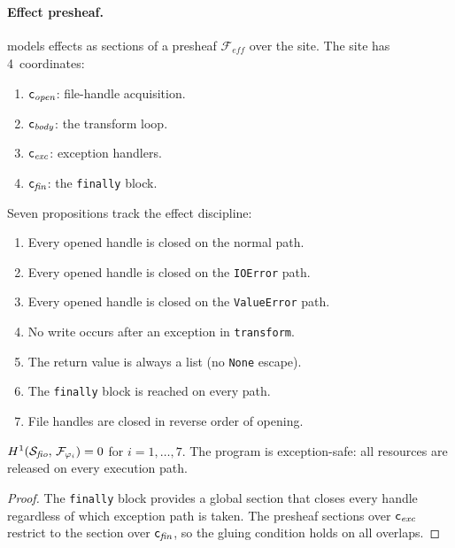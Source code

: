 \paragraph{Effect presheaf.}
\JuGeo{} models effects as sections of a presheaf
$\mathcal{F}_{\mathit{eff}}$ over the site.  The site has
4~coordinates:
\begin{enumerate}[nosep,label=(\roman*)]
  \item $\mathsf{c}_{\mathit{open}}$: file-handle acquisition.
  \item $\mathsf{c}_{\mathit{body}}$: the transform loop.
  \item $\mathsf{c}_{\mathit{exc}}$: exception handlers.
  \item $\mathsf{c}_{\mathit{fin}}$: the \texttt{finally} block.
\end{enumerate}

Seven propositions track the effect discipline:
\begin{enumerate}[nosep,label=(\roman*)]
  \item Every opened handle is closed on the normal path.
  \item Every opened handle is closed on the \texttt{IOError} path.
  \item Every opened handle is closed on the \texttt{ValueError} path.
  \item No write occurs after an exception in \texttt{transform}.
  \item The return value is always a list (no \texttt{None} escape).
  \item The \texttt{finally} block is reached on every path.
  \item File handles are closed in reverse order of opening.
\end{enumerate}

\begin{theorem}\label{thm:exc-safety}
$H^{1}(\mathcal{S}_{\mathit{fio}},\,
           \mathcal{F}_{\varphi_i}) = 0$
for $i = 1,\ldots,7$.  The program is exception-safe: all resources
are released on every execution path.
\end{theorem}

\begin{proof}
The \texttt{finally} block provides a global section that closes
every handle regardless of which exception path is taken.  The
presheaf sections over $\mathsf{c}_{\mathit{exc}}$ restrict to the
section over $\mathsf{c}_{\mathit{fin}}$, so the gluing condition holds
on all overlaps.
\end{proof}



